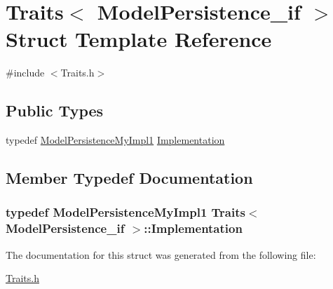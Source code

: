 \hypertarget{struct_traits_3_01_model_persistence__if_01_4}{\section{Traits$<$ Model\-Persistence\-\_\-if $>$ Struct Template Reference}
\label{struct_traits_3_01_model_persistence__if_01_4}
}


{\ttfamily \#include $<$Traits.\-h$>$}

\subsection*{Public Types}
\begin{DoxyCompactItemize}
\item 
typedef \hyperlink{class_model_persistence_my_impl1}{Model\-Persistence\-My\-Impl1} \hyperlink{struct_traits_3_01_model_persistence__if_01_4_aab21a3f51580006b6926b0ee0e4d6302}{Implementation}
\end{DoxyCompactItemize}


\subsection{Member Typedef Documentation}
\hypertarget{struct_traits_3_01_model_persistence__if_01_4_aab21a3f51580006b6926b0ee0e4d6302}{
\subsubsection[{Implementation}]{\setlength{\rightskip}{0pt plus 5cm}typedef {\bf Model\-Persistence\-My\-Impl1} {\bf Traits}$<$ {\bf Model\-Persistence\-\_\-if} $>$\-::{\bf Implementation}}}\label{struct_traits_3_01_model_persistence__if_01_4_aab21a3f51580006b6926b0ee0e4d6302}


The documentation for this struct was generated from the following file\-:\begin{DoxyCompactItemize}
\item 
\hyperlink{_traits_8h}{Traits.\-h}\end{DoxyCompactItemize}
